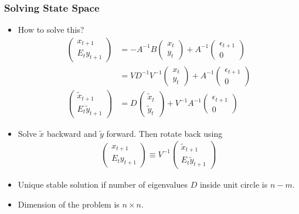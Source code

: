 \documentclass[english,xcolor=svgnames]{beamer}
\begin{document}
\begin{frame}
	\frametitle{Solving State Space}
	\begin{itemize}
		\item How to solve this?
		\begin{align*}
			\begin{pmatrix} x_{t+1} \\
				E_t y_{t+1}
		\end{pmatrix} &= 
			-A^{-1}B \begin{pmatrix} x_{t} \\
				y_{t}
		\end{pmatrix} + A^{-1} \begin{pmatrix} \epsilon_{t+1} \\
			0
	\end{pmatrix}  \\
	&=VD^{-1}V^{-1} \begin{pmatrix} x_{t} \\
		y_{t}
\end{pmatrix} + A^{-1} \begin{pmatrix} \epsilon_{t+1} \\
	0
\end{pmatrix}  \\
	\begin{pmatrix} \tilde{x}_{t+1} \\
		E_t \tilde{y}_{t+1}
\end{pmatrix} &= 
	D \begin{pmatrix} \tilde{x}_{t} \\
		\tilde{y}_{t}
\end{pmatrix} + V^{-1}A^{-1} \begin{pmatrix} \epsilon_{t+1} \\
	0
\end{pmatrix}  
		\end{align*}
		\item Solve $\tilde{x}$ backward and $\tilde{y}$ forward. Then rotate back using
		\begin{align*}
			\begin{pmatrix} x_{t+1} \\
				E_t y_{t+1}
		\end{pmatrix} \equiv V^{-1} \begin{pmatrix} \tilde{x}_{t+1} \\
			E_t \tilde{y}_{t+1}
	\end{pmatrix} 
		\end{align*}
		\item Unique stable solution if number of eigenvalues $D$ inside unit circle is $n-m$.
		\item Dimension of the problem is $n\times n$.
	 \end{itemize}
 \end{frame}
\end{document}
